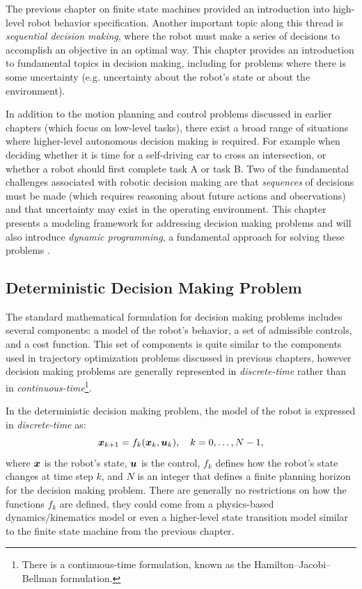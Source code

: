 The previous chapter on finite state machines provided an introduction into high-level robot behavior specification. Another important topic along this thread is \textit{sequential decision making}\cite{Bertsekas2019}, where the robot must make a series of decisions to accomplish an objective in an optimal way. 
This chapter provides an introduction to fundamental topics in decision making, including for problems where there is some uncertainty (e.g. uncertainty about the robot's state or about the environment).

In addition to the motion planning and control problems discussed in earlier chapters (which focus on low-level tasks), there exist a broad range of situations where higher-level autonomous decision making is required. For example when deciding whether it is time for a self-driving car to cross an intersection, or whether a robot should first complete task A or task B.
Two of the fundamental challenges associated with robotic decision making are that \textit{sequences} of decisions must be made (which requires reasoning about future actions and observations) and that uncertainty may exist in the operating environment. This chapter presents a modeling framework for addressing decision making problems and will also introduce \textit{dynamic programming}, a fundamental approach for solving these problems .


\subsection{Deterministic Decision Making Problem}
The standard mathematical formulation for decision making problems includes several components: a model of the robot's behavior, a set of admissible controls, and a cost function. This set of components is quite similar to the components used in trajectory optimization problems discussed in previous chapters, however decision making problems are generally represented in \textit{discrete-time} rather than in \textit{continuous-time}\footnote{There is a continuous-time formulation, known as the Hamilton–Jacobi–Bellman formulation.}.

In the deterministic decision making problem, the model of the robot is expressed in \textit{discrete-time} as:
\begin{equation} \label{eq:detmodel}
\bm{x}_{k+1}= f_k(\bm{x}_k, \bm{u}_k), \quad k = 0, \dots, N-1,
\end{equation}
where $\bm{x}$ is the robot's state, $\bm{u}$ is the control, $f_k$ defines how the robot's state changes at time step $k$, and $N$ is an integer that defines a finite planning horizon for the decision making problem. There are generally no restrictions on how the functions $f_k$ are defined, they could come from a physics-based dynamics/kinematics model or even a higher-level state transition model similar to the finite state machine from the previous chapter.

